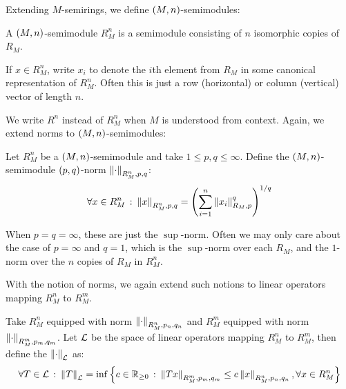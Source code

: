 Extending \(M\)-semirings,
we define \(\left(M, n\right)\)-semimodules:

\begin{definition}
  A \(\left(M, n\right)\)-semimodule \(R_M ^n\)
  is a semimodule consisting of \(n\) isomorphic copies of \(R_M\).
\end{definition}

If \(x \in R_M ^n\), write \(x_i\) to denote the \(i\)th element from
\(R_M\) in some canonical representation of \(R_M ^n\).
Often this is just a row (horizontal) or column (vertical)
vector of length \(n\).

We write \(R^n\) instead of \(R_M ^n\) when \(M\) is understood from context.
Again, we extend norms to \(\left(M, n\right)\)-semimodules:

\begin{definition}
  Let \(R_M ^n\) be a \(\left(M, n\right)\)-semimodule
  and take \(1 \leq p, q \leq \infty\).
  Define the \(\left(M, n\right)\)-semimodule \(\left(p, q\right)\)-norm
  \(\left\lVert\cdot\right\rVert_{R_M ^n, p, q}\):
  \begin{align*}
    \forall x \in R_M ^n \ \colon
      \left\lVert x\right\rVert_{R_M ^n, p, q}
        = \left(\sum_{i = 1}^{n} \left\lVert x_i\right\rVert_{R_M, p}^q\right)^{1 / q}
  \end{align*}
\end{definition}

When \(p = q = \infty\), these are just the \(\sup\)-norm.
Often we may only care about the case of \(p = \infty\) and \(q = 1\),
which is the \(\sup\)-norm over each \(R_M\),
and the \(1\)-norm over the \(n\) copies of \(R_M\) in \(R_M ^n\).

With the notion of norms, we again extend such notions to
linear operators mapping \(R_M ^n\) to \(R_M ^m\).

\begin{definition}
  Take \(R_M ^n\) equipped with norm \(\left\lVert\cdot\right\rVert_{R_M ^n, p_n, q_n}\)
  and \(R_M ^m\) equipped with norm \(\left\lVert\cdot\right\rVert_{R_M ^m, p_m, q_m}\).
  Let \(\mathcal{L}\) be the space of linear operators mapping
  \(R_M ^n\) to \(R_M ^m\),
  then define the \(\left\lVert\cdot\right\rVert_{\mathcal{L}}\) as:
  \begin{align*}
    \forall T \in \mathcal{L} \ \colon
      \left\lVert T\right\rVert_{\mathcal{L}} =
        \inf \left\{c \in \mathbb{R}_{\geq 0} \ \colon
                \left\lVert Tx\right\rVert_{R_M ^m, p_m, q_m}
                  \leq c \left\lVert x\right\rVert_{R_M ^n, p_n, q_n},
                \forall x \in R_M ^n\right\}
  \end{align*}
\end{definition}



